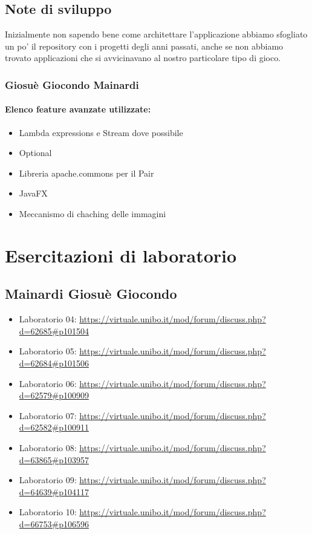\documentclass[a4paper,12pt]{report}
\begin{document}
\section{Note di sviluppo}

Inizialmente non sapendo bene come architettare l'applicazione abbiamo sfogliato un po' il repository con i progetti degli 
anni passati, anche se non abbiamo trovato applicazioni che si avvicinavano al nostro particolare tipo di gioco.

\subsection*{Giosuè Giocondo Mainardi}
\subsubsection{Elenco feature avanzate utilizzate:}
\begin{itemize}
	\item Lambda expressions e Stream dove possibile
	\item Optional
	\item Libreria apache.commons per il Pair 
	\item JavaFX
	\item Meccanismo di chaching delle immagini
\end{itemize}

\appendix

\chapter{Esercitazioni di laboratorio}

\section{Mainardi Giosuè Giocondo}

\begin{itemize}
	\item Laboratorio 04: \url{https://virtuale.unibo.it/mod/forum/discuss.php?d=62685#p101504}
	\item Laboratorio 05: \url{https://virtuale.unibo.it/mod/forum/discuss.php?d=62684#p101506}
	\item Laboratorio 06: \url{https://virtuale.unibo.it/mod/forum/discuss.php?d=62579#p100909}
	\item Laboratorio 07: \url{https://virtuale.unibo.it/mod/forum/discuss.php?d=62582#p100911}
	\item Laboratorio 08: \url{https://virtuale.unibo.it/mod/forum/discuss.php?d=63865#p103957}
	\item Laboratorio 09: \url{https://virtuale.unibo.it/mod/forum/discuss.php?d=64639#p104117}
	\item Laboratorio 10: \url{https://virtuale.unibo.it/mod/forum/discuss.php?d=66753#p106596}
\end{itemize}
\end{document}
